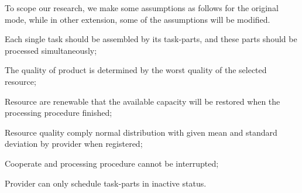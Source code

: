 To scope our research, we make some assumptions as follows for the original mode, while in other extension, some of the assumptions will be modified.
\begin{compactitem}
\item Each single task should be assembled by its task-parts, and these parts should be processed simultaneously;
\item The quality of product is determined by the worst quality of the selected resource;
\item Resource are renewable that the available capacity will be restored when the processing procedure finished;
\item Resource quality comply normal distribution with given mean and standard deviation by provider when registered;
\item Cooperate and processing procedure cannot be interrupted;
\item Provider can only schedule task-parts in inactive status.
\end{compactitem}


